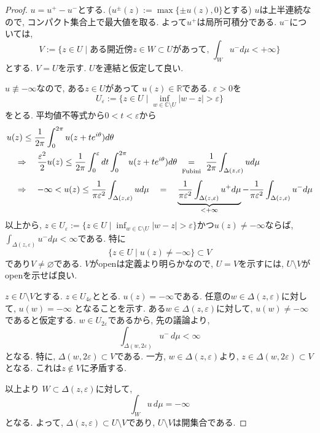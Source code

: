 \documentclass[dvipdfmx,a4paper,11pt]{report} %
\theoremstyle{definition}
\theoremstyle{remark}
\numberwithin{equation}{section}
\newcommand{\underalign}[2]{\quad \underset{\mathclap{\strut #1}}{#2}\quad}
\newcommand{\R}{\mathbb{R}}
\newcommand{\C}{\mathbb{C}}
\begin{document}
\begin{proof}
$u=u^{+} - u^{-}$とする. 
($u^{\pm}(z):= \max\{ \pm u(z), 0\}$とする)
$u$は上半連続なので, コンパクト集合上で最大値を取る. よって$u^{+}$は局所可積分である.
$u^{-}$については, 
$$
V:= \{ z \in U \mid \text{ある開近傍$z \in W \subset U$があって, 
$\int_{W} u^{-} d \mu < +\infty$} \}
$$
とする. $V=U$を示す. $U$を連結と仮定して良い. 

$u \not \equiv - \infty$なので, ある$z \in U$があって
$u(z) \in \R$である. 
$\varepsilon >0$を
$$
U_\varepsilon := \{ z \in U \mid\inf_{w \in \C \setminus U}|w - z|>\varepsilon \}
$$
をとる. 平均値不等式から$0 < t < \varepsilon$から
\begin{align*}
&u(z) \le \frac{1}{2 \pi}\int_{0}^{2\pi}u(z + t e^{i \theta}) d \theta
\\
&\underalign{\text{}}{\Rightarrow}
\frac{\varepsilon^2}{2}u(z) \le 
\frac{1}{2 \pi}\int_{0}^{\varepsilon } dt\int_{0}^{2\pi}u(z + t e^{i \theta}) d \theta
\underalign{\text{Fubini}}{=}
\frac{1}{2 \pi}\int_{\Delta(z, \varepsilon)} u d \mu
\\
&\underalign{\text{}}{\Rightarrow}
- \infty < u(z) \le 
\frac{1}{\pi \varepsilon^2 }\int_{\Delta(z, \varepsilon)} u d \mu
\underalign{\text{}}{=}
\underbrace{\frac{1}{\pi \varepsilon^2 }\int_{\Delta(z, \varepsilon)} u^{+} d \mu}_{<+\infty}
-
\frac{1}{\pi \varepsilon^2 }\int_{\Delta(z, \varepsilon)} u^{-} d \mu
\end{align*}
以上から, $z \in U_\varepsilon := \{ z \in U \mid\inf_{w \in \C \setminus U}|w - z|>\varepsilon \}$かつ$u(z) \neq - \infty$ならば, $\int_{\Delta(z, \varepsilon)} u^{-} d \mu< \infty$である. 
特に
$$
\{ z \in U \mid u(z) \neq - \infty\}
\subset 
V
$$
であり$V \neq \varnothing$である. 
$V$がopenは定義より明らかなので, $U =V$を示すには, $U \setminus V$がopenを示せば良い. 
 
 
 $z \in U \setminus V$とする. $z \in U_{4 \varepsilon}$ととる.
 $u(z)=-\infty$である. 
 任意の$w \in \Delta(z,\varepsilon)$に対して,
\(
u(w)=-\infty
\)
となることを示す.
ある$w \in \Delta(z,\varepsilon)$に対して,
$u(w) \neq -\infty$であると仮定する.
$w \in U_{2\varepsilon}$であるから, 先の議論より,
\[
\int_{\Delta(w,2\varepsilon)} u^-\,d\mu < \infty
\]
となる.
特に, $\Delta(w,2\varepsilon) \subset V$である.
一方, $w \in \Delta(z,\varepsilon)$より,
\(
z \in \Delta(w,2\varepsilon) \subset V
\)
となる.
これは$z \notin V$に矛盾する.

以上より 
$W \subset \Delta(z,\varepsilon)$に対して,
\[
\int_W u\,d\mu=-\infty
\]
となる.
よって, $\Delta(z,\varepsilon) \subset U \setminus V$であり,
$U \setminus V$は開集合である.


\end{proof}
\end{document}
